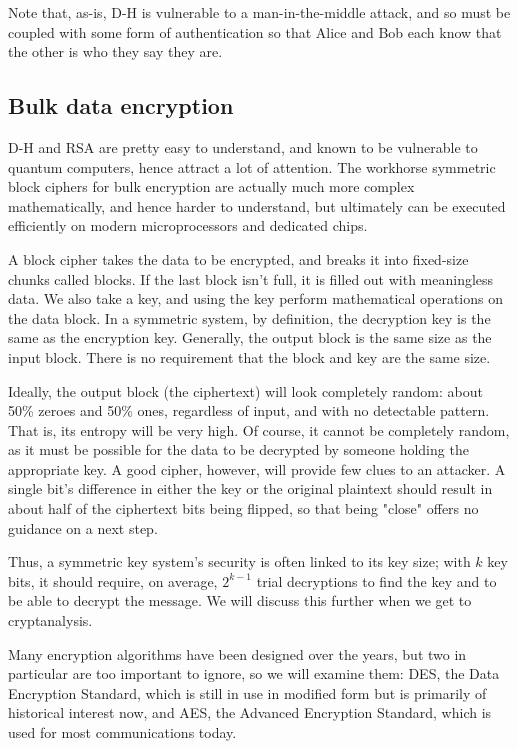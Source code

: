 Note that, as-is, D-H is vulnerable to a man-in-the-middle attack, and
so must be coupled with some form of authentication so that Alice and
Bob each know that the other is who they say they are.

\subsection{Bulk data encryption}

D-H and RSA are pretty easy to understand, and known to be vulnerable
to quantum computers, hence attract a lot of attention. The workhorse
symmetric block ciphers for bulk encryption are actually much more
complex mathematically, and hence harder to understand, but ultimately
can be executed efficiently on modern microprocessors and dedicated
chips.

A block cipher takes the data to be encrypted, and breaks it into
fixed-size chunks called blocks.  If the last block isn't full, it is
filled out with meaningless data.  We also take a key, and using the
key perform mathematical operations on the data block.  In a symmetric
system, by definition, the decryption key is the same as the
encryption key.  Generally, the output block is the same size as the
input block.  There is no requirement that the block and key are the
same size.

Ideally, the output block (the ciphertext) will look completely
random: about 50\% zeroes and 50\% ones, regardless of input, and with
no detectable pattern.  That is, its entropy will be very high.  Of
course, it cannot be completely random, as it must be possible for the
data to be decrypted by someone holding the appropriate key.  A good
cipher, however, will provide few clues to an attacker.  A single
bit's difference in either the key or the original plaintext should
result in about half of the ciphertext bits being flipped, so that
being "close" offers no guidance on a next step.

Thus, a symmetric key system's security is often linked to its key
size; with $k$ key bits, it should require, on average, $2^{k-1}$
trial decryptions to find the key and to be able to decrypt the
message.  We will discuss this further when we get to cryptanalysis.

Many encryption algorithms have been designed over the years, but two
in particular are too important to ignore, so we will examine them:
DES, the Data Encryption Standard, which is still in use in modified
form but is primarily of historical interest now, and AES, the
Advanced Encryption Standard, which is used for most communications
today.

